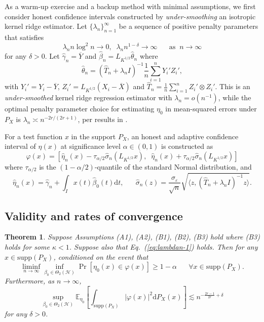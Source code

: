\documentclass[11pt,a4paper]{article}
\renewcommand{\hat}{\widehat}
\renewcommand{\tilde}{\widetilde}
\renewcommand{\bar}{\overline}
\theoremstyle{definition}
\theoremstyle{plain}
\newtheorem{theorem}{Theorem}[section]
\theoremstyle{remark}
\newcommand{\supp}{\mathrm{supp}}
\newcommand{\ud}{\mathrm d}
\newcommand{\mH}{\mathcal H}
\begin{document}
As a warm-up exercise and a backup method with minimal assumptions, we first consider honest confidence intervals constructed by \emph{under-smoothing} an isotropic kernel ridge estimator.
Let $\{\lambda_n\}_{n=1}^{\infty}$ be a sequence of positive penalty parameters that satisfies
\begin{equation}
\lambda_n n\log^2 n \to 0,\;\; \lambda_n n^{1-\delta}\to \infty\;\;\;\;\;\;\text{as}\;\;n\to\infty
\label{eq:lambdan-1}
\end{equation}
for any $\delta>0$.
Let $\hat\gamma_n = \bar Y$ and $\hat\beta_n=L_{K^{1/2}}\hat\theta_n$ where 
$$
\hat\theta_n = (\hat T_n+\lambda_n I)^{-1}\frac{1}{n}\sum_{i=1}^n Y_i'Z_i',
$$
with $Y_i'=Y_i-\bar Y$, $Z_i'=L_{K^{1/2}}(X_i-\bar X)$ and $\hat T_n=\frac{1}{n}\sum_{i=1}^n Z_i'\otimes Z_i'$.
This is an \emph{under-smoothed} kernel ridge regression estimator with $\lambda_n=o(n^{-1})$, while the optimal penalty parameter choice for estimating $\eta_0$ in mean-squared errors under $P_X$
is $\lambda_n\asymp n^{-2r/(2r+1)}$, per results in \cite{cai2012minimax}.

For a test function $x$ in the support $P_X$, an honest and adaptive confidence interval of $\eta(x)$ at significance level $\alpha\in(0,1)$ is constructed as
$$
\varphi(x) = [\hat\eta_n(x)-\tau_{\alpha/2}\hat\sigma_n(L_{K^{1/2}}x),\;\; \hat\eta_n(x)+\tau_{\alpha/2}\hat\sigma_n(L_{K^{1/2}}x)]
$$
where $\tau_{\alpha/2}$ is the $(1-\alpha/2)$-quantile of the standard Normal distribution, and
$$
\hat\eta_n(x) = \hat\gamma_n + \int_I x(t)\hat\beta_0(t)\ud t,\;\;\;\;\;\;\hat\sigma_n(z) = \frac{\sigma_\varepsilon}{\sqrt{n}}\sqrt{\langle z, (\hat T_n+\lambda_n I)^{-1}z\rangle}.
$$

\subsection{Validity and rates of convergence}

\begin{theorem}
Suppose Assumptions (A1), (A2), (B1), (B2), (B3) hold where (B3) holds for some $\kappa<1$. Suppose also that Eq.~(\ref{eq:lambdan-1}) holds. Then 
for any $x\in\supp(P_X)$, conditioned on the event that
\begin{equation}
\liminf_{n\to\infty}\inf_{\beta_0\in\Theta_2(\mH)} \Pr[\eta_0(x)\in\varphi(x)] \geq 1-\alpha\;\;\;\;\;\;\forall x\in\supp(P_X).
\label{eq:simple-validity}
\end{equation}
Furthermore, as $n\to\infty$, 
\begin{equation}
\sup_{\beta_0\in\Theta_2(\mH)}\mathbb E_{\eta_0}\left[\int_{\supp(P_X)}\big|\varphi(x)\big|^2\ud P_X(x)\right]\lesssim n^{-\frac{2r-1}{2r}+\delta}
\label{eq:simple-validity}
\end{equation}
for any $\delta>0$.
\label{thm:simple}
\end{theorem}
\end{document}
